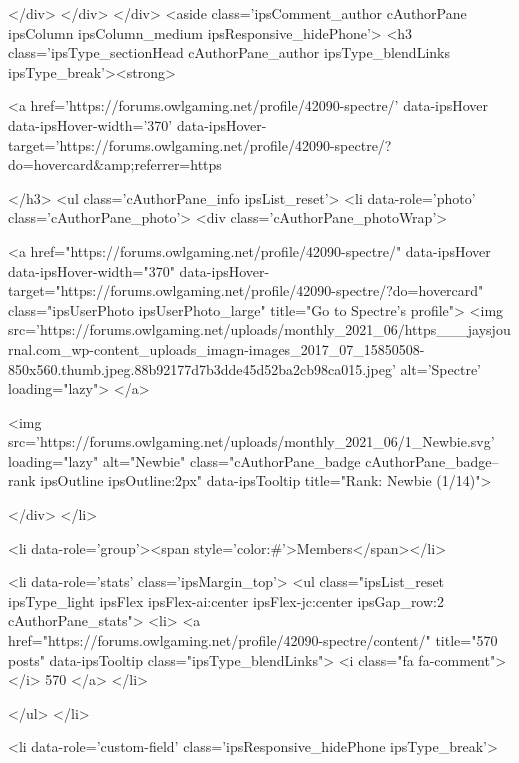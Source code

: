 			</div>
		</div>
	</div>
	<aside class='ipsComment_author cAuthorPane ipsColumn ipsColumn_medium ipsResponsive_hidePhone'>
		<h3 class='ipsType_sectionHead cAuthorPane_author ipsType_blendLinks ipsType_break'><strong>


<a href='https://forums.owlgaming.net/profile/42090-spectre/' data-ipsHover data-ipsHover-width='370' data-ipsHover-target='https://forums.owlgaming.net/profile/42090-spectre/?do=hovercard&amp;referrer=https%
			
		</h3>
		<ul class='cAuthorPane_info ipsList_reset'>
			<li data-role='photo' class='cAuthorPane_photo'>
				<div class='cAuthorPane_photoWrap'>
					


	<a href="https://forums.owlgaming.net/profile/42090-spectre/" data-ipsHover data-ipsHover-width="370" data-ipsHover-target="https://forums.owlgaming.net/profile/42090-spectre/?do=hovercard" class="ipsUserPhoto ipsUserPhoto_large" title="Go to Spectre's profile">
		<img src='https://forums.owlgaming.net/uploads/monthly_2021_06/https___jaysjournal.com_wp-content_uploads_imagn-images_2017_07_15850508-850x560.thumb.jpeg.88b92177d7b3dde45d52ba2cb98ca015.jpeg' alt='Spectre' loading="lazy">
	</a>

					
					
						
<img src='https://forums.owlgaming.net/uploads/monthly_2021_06/1_Newbie.svg' loading="lazy" alt="Newbie" class="cAuthorPane_badge cAuthorPane_badge--rank ipsOutline ipsOutline:2px" data-ipsTooltip title="Rank: Newbie (1/14)">
					
				</div>
			</li>
			
				<li data-role='group'><span style='color:#'>Members</span></li>
				
			
			
				<li data-role='stats' class='ipsMargin_top'>
					<ul class="ipsList_reset ipsType_light ipsFlex ipsFlex-ai:center ipsFlex-jc:center ipsGap_row:2 cAuthorPane_stats">
						<li>
							<a href="https://forums.owlgaming.net/profile/42090-spectre/content/" title="570 posts" data-ipsTooltip class="ipsType_blendLinks">
								<i class="fa fa-comment"></i> 570
							</a>
						</li>
						
					</ul>
				</li>
			
			
				

	
	<li data-role='custom-field' class='ipsResponsive_hidePhone ipsType_break'>
		
